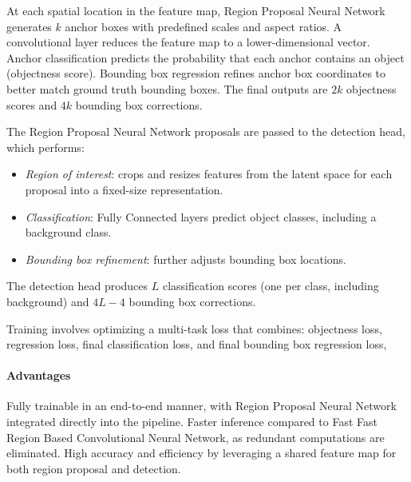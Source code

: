 At each spatial location in the feature map, Region Proposal Neural Network generates $k$ anchor boxes with predefined scales and aspect ratios.
A convolutional layer reduces the feature map to a lower-dimensional vector.
Anchor classification predicts the probability that each anchor contains an object (objectness score).
Bounding box regression refines anchor box coordinates to better match ground truth bounding boxes.
The final outputs are $2k$ objectness scores and $4k$ bounding box corrections.

The Region Proposal Neural Network proposals are passed to the detection head, which performs:
\begin{itemize}
    \item \textit{Region of interest}: crops and resizes features from the latent space for each proposal into a fixed-size representation.
    \item \textit{Classification}: Fully Connected layers predict object classes, including a background class.
    \item \textit{Bounding box refinement}: further adjusts bounding box locations.
\end{itemize}
The detection head produces $L$ classification scores (one per class, including background) and $4L-4$ bounding box corrections.

Training involves optimizing a multi-task loss that combines: objectness loss, regression loss, final classification loss, and final bounding box regression loss,

\paragraph*{Advantages}
Fully trainable in an end-to-end manner, with Region Proposal Neural Network integrated directly into the pipeline.
Faster inference compared to Fast Fast Region Based Convolutional Neural Network, as redundant computations are eliminated.
High accuracy and efficiency by leveraging a shared feature map for both region proposal and detection.

